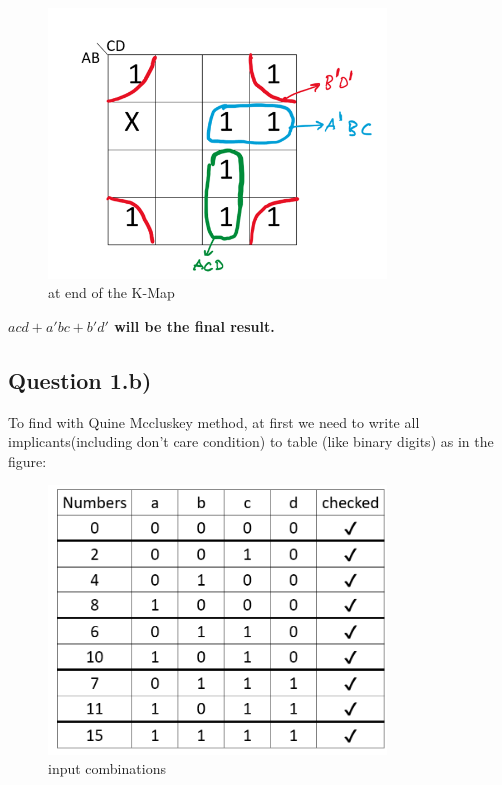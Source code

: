 \documentclass[pdftex,12pt,a4paper]{article}
\begin{document}
   \begin{figure}[H]
    	\centering
    	\includegraphics[width=0.8\textwidth]{preliminary/kmap_last.png}	
    	\caption{at end of the K-Map}
    	\label{at end of the K-Map}
    \end{figure}
    
 \begin{center} \textbf{$acd+a'bc+b'd'$ will be the final result.}
\end{center}


\subsection{Question 1.b)}
To find with Quine Mccluskey method, at first we need to write all implicants(including don't care condition) to table (like binary digits) as in the figure:
   \begin{figure}[H]
    	\centering
    	\includegraphics[width=0.8\textwidth]{preliminary/input_combinations.png}	
    	\caption{input combinations}
    	\label{input combinations}
    \end{figure}
\end{document}
